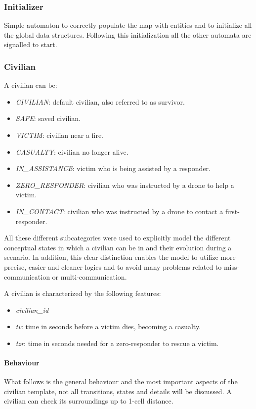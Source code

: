 \subsubsection{Initializer}
Simple automaton to correctly populate the map with entities and to initialize all the global data structures. Following this initialization all the other automata are signalled to start.


\subsubsection{Civilian}
A civilian can be:
\begin{itemize}
	\item \textit{CIVILIAN}: default civilian, also referred to as survivor.
	\item \textit{SAFE}: saved civilian.
	\item \textit{VICTIM}: civilian near a fire.
	\item \textit{CASUALTY}: civilian no longer alive.
	\item \textit{IN\_ASSISTANCE}: victim who is being assisted by a responder.
	\item \textit{ZERO\_RESPONDER}: civilian who was instructed by a drone to help a victim.
	\item \textit{IN\_CONTACT}: civilian who was instructed by a drone to contact a first-responder.
\end{itemize}

\noindent
All these different subcategories were used to explicitly model the different conceptual states in which a civilian can be in and their evolution during a scenario. In addition, this clear distinction enables the model to utilize more precise, easier and cleaner logics and to avoid many problems related to miss-communication or multi-communication.\newline

\noindent
A civilian is characterized by the following features:
\begin{itemize}
	\item \textit{civilian\_id}
	\item \textit{tv}: time in seconds before a victim dies, becoming a casualty.
	\item \textit{tzr}: time in seconds needed for a zero-responder to rescue a victim.
\end{itemize}

\paragraph{Behaviour}
What follows is the general behaviour and the most important aspects of the civilian template, not all transitions, states and details will be discussed.\newline
A civilian can check its surroundings up to 1-cell distance.

